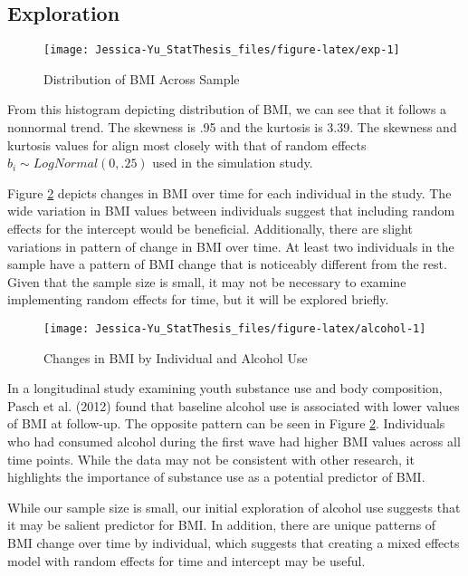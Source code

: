 \documentclass[12pt, twoside]{amherstthesis}
\begin{document}
\hypertarget{exploration}{%
\subsection{Exploration}\label{exploration}}
\begin{figure}

{\centering \texttt{[image: Jessica-Yu\_StatThesis\_files/figure-latex/exp-1]} 

}

\caption{Distribution of BMI Across Sample}\label{fig:exp}
\end{figure}
From this histogram depicting distribution of BMI, we can see that it follows a nonnormal trend. The skewness is .95 and the kurtosis is 3.39. The skewness and kurtosis values for align most closely with that of random effects \(b_i \sim\mathit{LogNormal}(0,.25)\) used in the simulation study.

Figure \ref{fig:alcohol} depicts changes in BMI over time for each individual in the study. The wide variation in BMI values between individuals suggest that including random effects for the intercept would be beneficial. Additionally, there are slight variations in pattern of change in BMI over time. At least two individuals in the sample have a pattern of BMI change that is noticeably different from the rest. Given that the sample size is small, it may not be necessary to examine implementing random effects for time, but it will be explored briefly.
\begin{figure}

{\centering \texttt{[image: Jessica-Yu\_StatThesis\_files/figure-latex/alcohol-1]} 

}

\caption{Changes in BMI by Individual and Alcohol Use}\label{fig:alcohol}
\end{figure}
In a longitudinal study examining youth substance use and body composition, Pasch et al. (2012) found that baseline alcohol use is associated with lower values of BMI at follow-up. The opposite pattern can be seen in Figure \ref{fig:alcohol}. Individuals who had consumed alcohol during the first wave had higher BMI values across all time points. While the data may not be consistent with other research, it highlights the importance of substance use as a potential predictor of BMI.

While our sample size is small, our initial exploration of alcohol use suggests that it may be salient predictor for BMI. In addition, there are unique patterns of BMI change over time by individual, which suggests that creating a mixed effects model with random effects for time and intercept may be useful.
\end{document}
